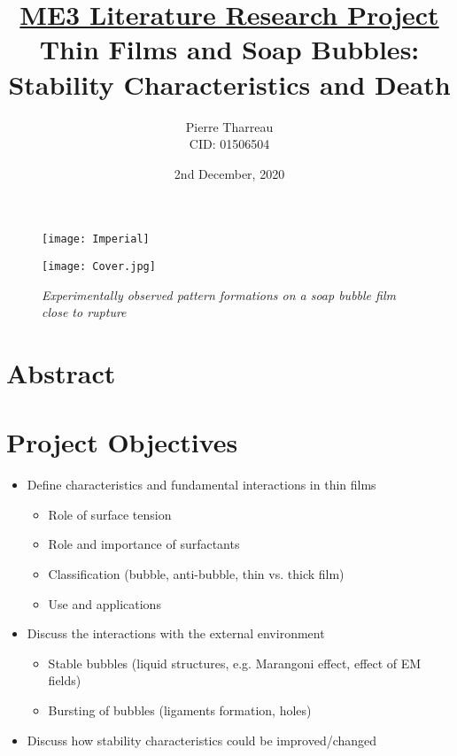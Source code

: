 \documentclass[a4paper,12pt]{article}
\numberwithin{equation}{section}
\numberwithin{figure}{section}
\numberwithin{table}{section}
\begin{document}
\begin{figure} [t]
    \texttt{[image: Imperial]}
\end{figure}



\title{\large \underline{ME3 Literature Research Project} \\ \huge Thin Films and Soap Bubbles: Stability Characteristics and Death}

\date{2nd December, 2020}
\author{Pierre Tharreau \\ CID: 01506504}
\maketitle

\begin{figure} [h]
    \centering
    \captionsetup{width=.9\linewidth}
    \texttt{[image: Cover.jpg]}
    \caption*{\textit{Experimentally observed pattern formations on a soap bubble film close to rupture \cite{Shen2020}}}
\end{figure}


\newpage
{}

\section*{Abstract}

\setcounter{page}{2}
\newpage
\section*{Project Objectives}

\begin{itemize}
    \item Define characteristics and fundamental interactions in thin films
    \begin{itemize}
        \item Role of surface tension
		\item Role and importance of surfactants
		\item Classification (bubble, anti-bubble, thin vs. thick film)
		\item Use and applications
    \end{itemize}
    \item Discuss the interactions with the external environment
    \begin{itemize}
        \item Stable bubbles (liquid structures, e.g. Marangoni effect, effect of EM fields)
		\item Bursting of bubbles (ligaments formation, holes)
    \end{itemize}
     \item Discuss how stability characteristics could be improved/changed
\end{itemize}
\end{document}
